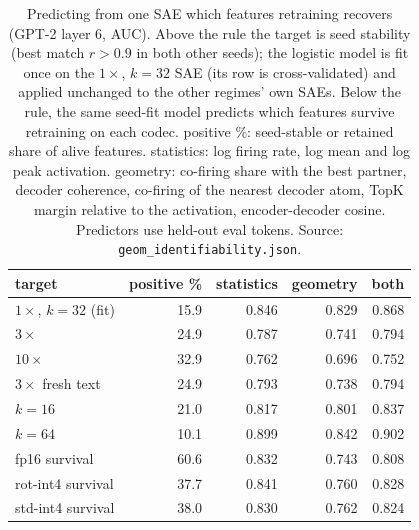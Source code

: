\begin{table}[htbp]
\caption{Predicting from one SAE which features retraining recovers (GPT-2 layer 6, AUC). Above the rule the target is seed stability (best match $r>0.9$ in both other seeds); the logistic model is fit once on the $1\times$, $k=32$ SAE (its row is cross-validated) and applied unchanged to the other regimes' own SAEs. Below the rule, the same seed-fit model predicts which features survive retraining on each codec. positive \%: seed-stable or retained share of alive features. statistics: log firing rate, log mean and log peak activation. geometry: co-firing share with the best partner, decoder coherence, co-firing of the nearest decoder atom, TopK margin relative to the activation, encoder-decoder cosine. Predictors use held-out eval tokens. Source: \texttt{geom\_identifiability.json}.}
\label{tab:stabpredict}
\centering\small
\begin{tabular}{lrrrr}
\toprule
target & positive \% & statistics & geometry & both \\
\midrule
$1\times$, $k=32$ (fit) & 15.9 & 0.846 & 0.829 & 0.868 \\
$3\times$ & 24.9 & 0.787 & 0.741 & 0.794 \\
$10\times$ & 32.9 & 0.762 & 0.696 & 0.752 \\
$3\times$ fresh text & 24.9 & 0.793 & 0.738 & 0.794 \\
$k=16$ & 21.0 & 0.817 & 0.801 & 0.837 \\
$k=64$ & 10.1 & 0.899 & 0.842 & 0.902 \\
\midrule
fp16 survival & 60.6 & 0.832 & 0.743 & 0.808 \\
rot-int4 survival & 37.7 & 0.841 & 0.760 & 0.828 \\
std-int4 survival & 38.0 & 0.830 & 0.762 & 0.824 \\
\bottomrule
\end{tabular}
\end{table}

